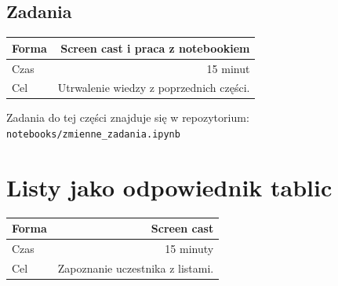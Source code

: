 \documentclass{mwart}
\begin{document}
\subsection{Zadania}
\begin{center}
  \begin{tabular}{lr}
    \toprule
    Forma & Screen cast i praca z notebookiem \\
    \midrule
    Czas & 15 minut \\
    Cel & Utrwalenie wiedzy z poprzednich części. \\
    \bottomrule
  \end{tabular}
\end{center}
Zadania do tej części znajduje się w repozytorium: \texttt{notebooks/zmienne\_zadania.ipynb}

\section{Listy jako odpowiednik tablic}
\begin{center}
  \begin{tabular}{lr}
    \toprule
    Forma & Screen cast \\
    \midrule
    Czas & 15 minuty \\
    Cel & Zapoznanie uczestnika z listami. \\
    \bottomrule
  \end{tabular}
\end{center}
\end{document}
